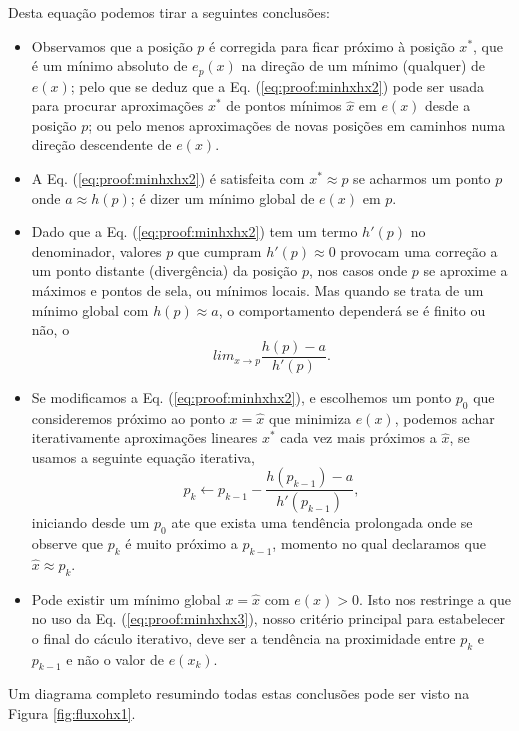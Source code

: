 \begin{myproofT}
Desta equação podemos tirar a seguintes conclusões:
\begin{itemize}

\item Observamos que a posição $p$ é corregida para ficar próximo à posição $x^*$, 
que é um mínimo absoluto de $e_p(x)$ na direção de um mínimo (qualquer) de $e(x)$;
pelo que se deduz que a Eq. (\ref{eq:proof:minhxhx2})
pode ser usada para procurar aproximações $x^*$ de pontos mínimos $\hat{x}$ em $e(x)$ desde a posição $p$;
ou pelo menos aproximações de novas posições em caminhos numa direção descendente de $e(x)$.

\item A Eq. (\ref{eq:proof:minhxhx2}) é satisfeita 
com $x^* \approx p$ se acharmos um  
ponto $p$ onde  $a \approx h(p)$; 
é dizer um mínimo global de $e(x)$ em $p$.%

\item Dado que a Eq. (\ref{eq:proof:minhxhx2}) tem um termo $h'(p)$ no denominador,
valores $p$ que cumpram $h'(p)\approx 0$ provocam uma correção a um ponto distante (divergência) da posição $p$,
nos casos onde $p$ se aproxime a máximos e pontos de sela,
ou mínimos locais. 
Mas quando se trata de um mínimo global com $h(p)\approx a$, 
o comportamento dependerá se é finito ou não, o
\begin{equation}
lim_{x\rightarrow p } \frac{h(p)-a}{h'(p)}.
\end{equation}

\item Se modificamos a Eq. (\ref{eq:proof:minhxhx2}), e escolhemos um ponto  
$p_0$ que consideremos próximo ao ponto $x=\hat{x}$ que minimiza $e(x)$,
podemos achar iterativamente aproximações lineares $x^*$ cada vez mais próximos a  $\hat{x}$,
se usamos a seguinte equação iterativa,
\begin{equation}\label{eq:proof:minhxhx3}
p_{k} \leftarrow p_{k-1} - \frac{ h(p_{k-1})-a}{h'(p_{k-1})},
\end{equation}
iniciando desde um $p_{0}$ 
ate que exista uma tendência prolongada onde se observe que $p_{k}$ é muito próximo a $p_{k-1}$,
momento no qual declaramos que $\hat{x} \approx p_{k}$.
\item Pode existir um mínimo global $x=\hat{x}$ com $e(x)>0$.
Isto nos restringe a que no uso da Eq. (\ref{eq:proof:minhxhx3}),
nosso critério principal para estabelecer o final do cáculo iterativo,
deve ser a tendência na  proximidade entre $p_{k}$ e $p_{k-1}$ 
e não o valor de $e(x_k)$.
\end{itemize}

Um diagrama completo resumindo todas estas conclusões pode ser visto na Figura \ref{fig:fluxohx1}.
\end{myproofT}



